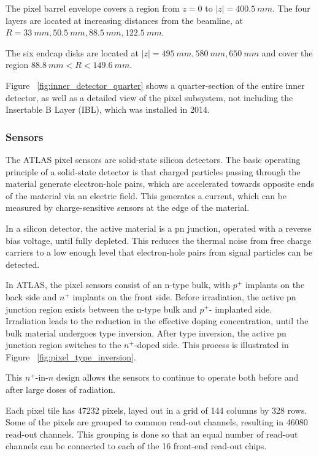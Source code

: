 The pixel barrel envelope covers a region
from $z = 0$ to $|z|  = 400.5~mm$. The four layers are located at
increasing distances from the beamline, at $R = 33~mm, 50.5~mm,
88.5~mm, 122.5~mm$.

The six endcap disks are located at $|z| = 495~mm, 580~mm, 650~mm$
and cover the region $88.8~mm < R < 149.6~mm$. \cite{atlas-detector-2008}

Figure ~\ref{fig:inner_detector_quarter} shows a quarter-section of
the entire inner detector, as well as a detailed view of the pixel
subsystem, not including the Insertable B Layer (IBL), which was
installed in 2014.

\subsubsection{Sensors}
The ATLAS pixel sensors are solid-state silicon detectors. The basic operating
principle of a solid-state detector is that charged particles passing
through the material generate electron-hole pairs, which are
accelerated towards opposite ends of the material via an electric
field. This generates a current, which can be measured by
charge-sensitive sensors at the edge of the material.\cite{spieler-2005}

In a silicon detector, the active material is a pn junction, operated
with a reverse bias voltage, until fully depleted. This reduces the thermal noise
from free charge carriers to a low enough level that electron-hole pairs from
signal particles can be detected.\cite{spieler-2005}

In ATLAS, the pixel sensors consist of an n-type bulk, with $p^+$
implants on the back side and $n^+$ implants on the front side. Before
irradiation, the active pn junction region exists between the n-type bulk and $p^+$-
implanted side. Irradiation leads to the reduction in the effective
doping concentration, until the bulk material undergoes type
inversion. After type inversion, the active pn junction region
switches to the $n^+$-doped side.\cite{pixels-2008} This process is illustrated in
Figure ~\ref{fig:pixel_type_inversion}.

This $n^+$-in-$n$ design allows the sensors to continue to operate
both before and after large doses of radiation.

Each pixel tile has 47232 pixels, layed out in a grid of 144 columns
by 328 rows. Some of the pixels are grouped to common read-out
channels, resulting in 46080 read-out channels. This grouping is done
so that an equal number of read-out channels can be connected to each
of the 16 front-end read-out chips.

